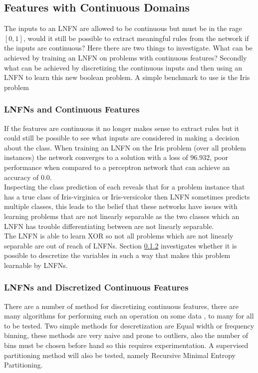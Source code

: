 \subsection{Features with Continuous Domains}
The inputs to an LNFN are allowed to be continuous but must be in the rage $[0, 1]$, would it still be possible to extract meaningful rules from the network if the inputs are continuous? Here there are two things to investigate. What can be achieved by training an LNFN on problems with continuous features? Secondly what can be achieved by discretizing the continuous inputs and then using an LNFN to learn this new boolean problem. A simple 
benchmark to use is the Iris problem \cite{Lichman:2013}

\subsubsection{LNFNs and Continuous Features} \label{subsubsec:lnfns-cont-features}
If the features are continuous it no longer makes sense to extract rules but it could still be possible to see what inputs are considered in making a decision about the class. When training an LNFN on the Iris problem (over all problem instances) the network converges to a solution with a loss of $96.932$, poor performance when compared to a perceptron network that can achieve an accuracy of $0.0$. \\

Inspecting the class prediction of each reveals that for a problem instance that has a true class of Iris-virginica or Iris-versicolor then LNFN sometimes predicts multiple classes, this leads to the belief that these networks have issues with learning problems that are not linearly separable as the two classes which an LNFN has trouble differentiating between are not linearly separable.\\

The LNFN is able to learn XOR so not all problems which are not linearly separable are out of reach of LNFNs. Section \ref{subsubsec:lnfns-desc-cont-features} investigates whether it is possible to descretize the variables in such a way that makes this problem learnable by LNFNs.


\subsubsection{LNFNs and Discretized Continuous Features} \label{subsubsec:lnfns-desc-cont-features}
There are a number of method for discretizing continuous features, there are many algorithms for performing such an operation on some data \cite{liu2002discretization}, to many for all to be tested. Two simple methods for descretization are Equal width or frequency binning, these methods are very naive and prone to outliers, also the number of bins must be chosen before hand so this requires experimentation. A supervised partitioning method will also be tested, namely Recursive Minimal Entropy Partitioning.\\

